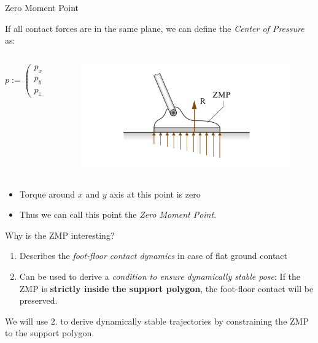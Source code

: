 \begin{frame}{Zero Moment Point}

If all contact forces are in the same plane, we can define the
\emph{Center of Pressure} as:

\begin{columns}
\begin{column}{0.5\textwidth}
\begin{equation*} \label{eq:zmp-definition}
p := \left(\begin{array}{c}
p_x \\ p_y \\ p_z
\end{array}\right)
   = \frac{\sum^N_{i=1}p_i f_{iz}}{\sum^N_{i=1} f_{iz}}
\end{equation*}
\end{column}

\begin{column}{0.5\textwidth}
\begin{figure}[b]
\includegraphics[width=\textwidth,resolution=300]{images/contact_forces.png}
\end{figure}
\end{column}
\end{columns}

\begin{itemize}
\itemsep1pt\parskip0pt
\item
  Torque around \(x\) and \(y\) axis at this point is zero
\item
  Thus we can call this point the \emph{Zero Moment Point}.
\end{itemize}

\end{frame}

\begin{frame}{Why is the ZMP interesting?}

\begin{enumerate}
\def\labelenumi{\arabic{enumi}.}
\item
  Describes the \emph{foot-floor contact dynamics} in case of flat
  ground contact
\item
  Can be used to derive a \emph{condition to ensure dynamically stable
  pose}: If the ZMP is \textbf{strictly inside the support polygon}, the
  foot-floor contact will be preserved.
\end{enumerate}

We will use \(2.\) to derive dynamically stable trajectories by
constraining the ZMP to the support polygon.

\end{frame}

